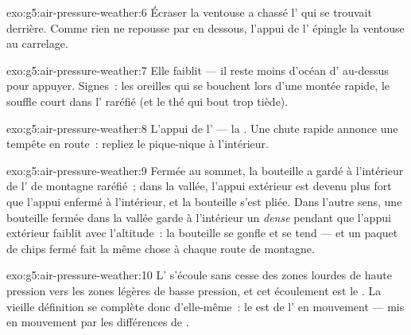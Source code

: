 \begin{solution}{exo:g5:air-pressure-weather:6}
Écraser la ventouse a chassé l' qui se trouvait derrière. Comme
rien ne repousse par en dessous, l'appui de l' épingle la
ventouse au carrelage.
\end{solution}

\begin{solution}{exo:g5:air-pressure-weather:7}
Elle faiblit --- il reste moins d'océan d' au-dessus pour appuyer.
Signes~: les oreilles qui se bouchent lors d'une montée rapide, le
souffle court dans l' raréfié (et le thé qui bout trop tiède).
\end{solution}

\begin{solution}{exo:g5:air-pressure-weather:8}
L'appui de l' --- la . Une chute
rapide annonce une tempête en route~: repliez le pique-nique à
l'intérieur.
\end{solution}

\begin{solution}{exo:g5:air-pressure-weather:9}
Fermée au sommet, la bouteille a gardé à l'intérieur de l' de
montagne raréfié~; dans la vallée, l'appui extérieur est devenu plus
fort que l'appui enfermé à l'intérieur, et la bouteille s'est pliée.
Dans l'autre sens, une bouteille fermée dans la vallée garde à
l'intérieur un  \emph{dense} pendant que l'appui extérieur
faiblit avec l'altitude~: la bouteille se gonfle et se tend --- et un
paquet de chips fermé fait la même chose à chaque route de montagne.
\end{solution}

\begin{solution}{exo:g5:air-pressure-weather:10}
L' s'écoule sans cesse des zones lourdes de haute pression vers
les zones légères de basse pression, et cet écoulement est le .
La vieille définition se complète donc d'elle-même~: le  est de
l' en mouvement --- mis en mouvement par les différences de
.
\end{solution}

